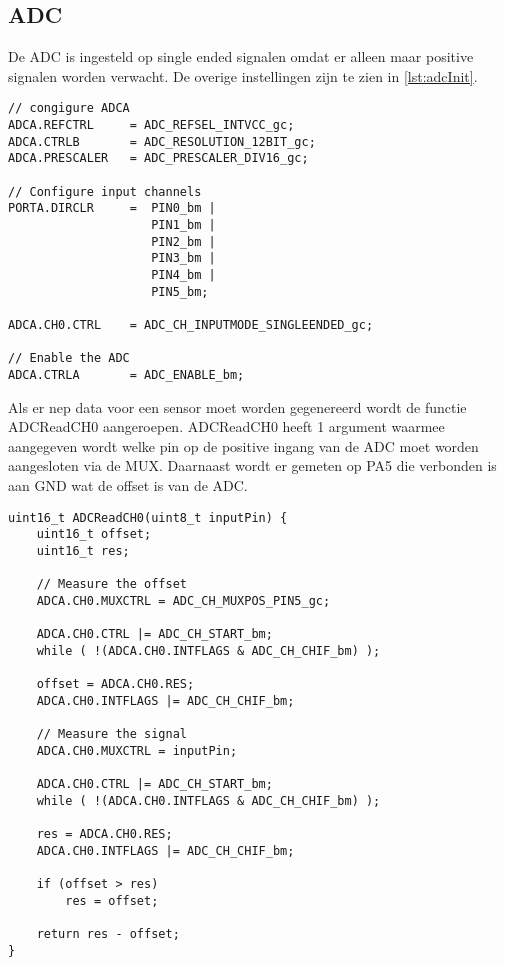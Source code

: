\subsection{ADC}
De ADC is ingesteld op single ended signalen omdat er alleen maar positive signalen worden verwacht. De overige instellingen zijn te zien in \autoref{lst:adcInit}.
\begin{lstlisting}[caption={ADC init},captionpos=b,label={lst:adcInit},style=c]
// congigure ADCA
ADCA.REFCTRL     = ADC_REFSEL_INTVCC_gc;
ADCA.CTRLB       = ADC_RESOLUTION_12BIT_gc;            
ADCA.PRESCALER   = ADC_PRESCALER_DIV16_gc;

// Configure input channels
PORTA.DIRCLR     =  PIN0_bm |
                    PIN1_bm |
                    PIN2_bm | 
                    PIN3_bm |
                    PIN4_bm |
                    PIN5_bm;

ADCA.CH0.CTRL    = ADC_CH_INPUTMODE_SINGLEENDED_gc;

// Enable the ADC
ADCA.CTRLA       = ADC_ENABLE_bm;
\end{lstlisting}
Als er nep data voor een sensor moet worden gegenereerd wordt de functie ADCReadCH0 aangeroepen. ADCReadCH0 heeft 1 argument waarmee aangegeven wordt welke pin op de positive ingang van de ADC moet worden aangesloten via de MUX. Daarnaast wordt er gemeten op PA5 die verbonden is aan GND wat de offset is van de ADC. 
\begin{lstlisting}[caption={ADCReadCH0},captionpos=b,label={lst:ADCReadCH0},style=c]
uint16_t ADCReadCH0(uint8_t inputPin) { 
    uint16_t offset;                                  
    uint16_t res;

    // Measure the offset
    ADCA.CH0.MUXCTRL = ADC_CH_MUXPOS_PIN5_gc;

    ADCA.CH0.CTRL |= ADC_CH_START_bm;
    while ( !(ADCA.CH0.INTFLAGS & ADC_CH_CHIF_bm) );
    
    offset = ADCA.CH0.RES;
    ADCA.CH0.INTFLAGS |= ADC_CH_CHIF_bm;

    // Measure the signal
    ADCA.CH0.MUXCTRL = inputPin;

    ADCA.CH0.CTRL |= ADC_CH_START_bm;
    while ( !(ADCA.CH0.INTFLAGS & ADC_CH_CHIF_bm) );

    res = ADCA.CH0.RES;
    ADCA.CH0.INTFLAGS |= ADC_CH_CHIF_bm;

    if (offset > res)
        res = offset;

    return res - offset;
}
\end{lstlisting}

